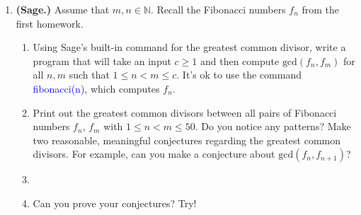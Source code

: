 \documentclass[11 pt]{article}
\theoremstyle{definition}
\theoremstyle{definition}
\def\NN{\mathbb{N}}
\def\divides{\big |}
\def\gcd#1#2{\textrm{gcd}({#1},{#2})}
\def\ord#1{|{#1}|}
\begin{document}
\begin{enumerate}
\begin{enumerate}
\begin{proof}
\begin{enumerate}
                            $a = bc$.\\
                        Case 2. $b < 0$.\\
                            $a = b(-c)$.\\
                        in either case, $b \divides a$ by definition.\\
                        Then $\ord b \divides a$ by definition.
            \end {enumerate}
            Therefore $b \divides a$ if and only if $gcd(a,b)= \ord b$
        \end{proof}
    \pagebreak%
	\item Show that if $c > 0$ then $\gcd {ac}{bc} = c (\gcd a b)$.
        \begin{proof}
        \end{proof}
	\end{enumerate}
    \pagebreak%

\item {\bf (Sage.)} Assume that $m, n \in \NN$.  Recall the Fibonacci numbers $f_n$ from the first homework.
	\begin{enumerate}
	\item Using Sage's built-in command for the greatest common divisor, write a program that will take an input $c \geq 1$ and then compute $\gcd {f_n}{f_m}$ for all $n, m$ such that $1 \leq n < m \leq c$.  It's ok to use the command \textcolor{blue}{fibonacci(n)}, which computes $f_n$.
	\item Print out the greatest common divisors between all pairs of Fibonacci numbers $f_n$, $f_m$ with $1 \leq n < m \leq 50$.  Do you notice any patterns?  Make two reasonable, meaningful conjectures regarding the greatest common divisors.  For example, can you make a conjecture about $\gcd {f_n}{f_{n+1}}$?  
	\item[]
	\item[] Can you prove your conjectures? Try!
	\end{enumerate}
	
\end{enumerate}
\end{document}
